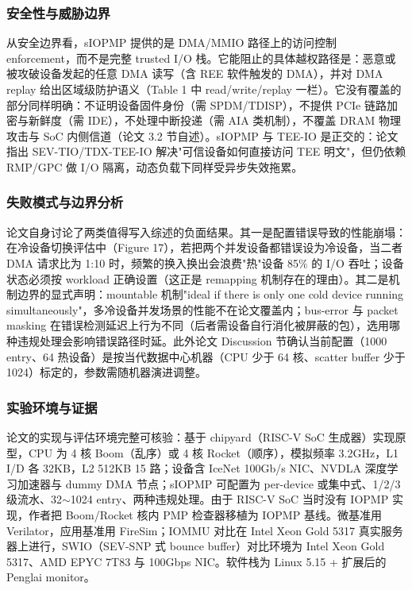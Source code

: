 \documentclass[11pt]{ctexart}
\begin{document}
\subsubsection{安全性与威胁边界}
从安全边界看，sIOPMP 提供的是 DMA/MMIO 路径上的访问控制 enforcement，而不是完整 trusted I/O 栈。它能阻止的具体越权路径是：恶意或被攻破设备发起的任意 DMA 读写（含 REE 软件触发的 DMA），并对 DMA replay 给出区域级防护语义（Table 1 中 read/write/replay 一栏）。它没有覆盖的部分同样明确：不证明设备固件身份（需 SPDM/TDISP），不提供 PCIe 链路加密与新鲜度（需 IDE），不处理中断投递（需 AIA 类机制），不覆盖 DRAM 物理攻击与 SoC 内侧信道（论文 3.2 节自述）。sIOPMP 与 TEE-IO 是正交的：论文指出 SEV-TIO/TDX-TEE-IO 解决"可信设备如何直接访问 TEE 明文"，但仍依赖 RMP/GPC 做 I/O 隔离，动态负载下同样受异步失效拖累。\par
\subsubsection{失败模式与边界分析}
论文自身讨论了两类值得写入综述的负面结果。其一是配置错误导致的性能崩塌：在冷设备切换评估中（Figure 17），若把两个并发设备都错误设为冷设备，当二者 DMA 请求比为 1:10 时，频繁的换入换出会浪费"热"设备 85\% 的 I/O 吞吐；设备状态必须按 workload 正确设置（这正是 remapping 机制存在的理由）。其二是机制边界的显式声明：mountable 机制"ideal if there is only one cold device running simultaneously"，多冷设备并发场景的性能不在论文覆盖内；bus-error 与 packet masking 在错误检测延迟上行为不同（后者需设备自行消化被屏蔽的包），选用哪种违规处理会影响错误路径时延。此外论文 Discussion 节确认当前配置（1000 entry、64 热设备）是按当代数据中心机器（CPU 少于 64 核、scatter buffer 少于 1024）标定的，参数需随机器演进调整。\par
\subsubsection{实验环境与证据}
论文的实现与评估环境完整可核验：基于 chipyard（RISC-V SoC 生成器）实现原型，CPU 为 4 核 Boom（乱序）或 4 核 Rocket（顺序），模拟频率 3.2GHz，L1 I/D 各 32KB，L2 512KB 15 路；设备含 IceNet 100Gb/s NIC、NVDLA 深度学习加速器与 dummy DMA 节点；sIOPMP 可配置为 per-device 或集中式、1/2/3 级流水、32$\sim$1024 entry、两种违规处理。由于 RISC-V SoC 当时没有 IOPMP 实现，作者把 Boom/Rocket 核内 PMP 检查器移植为 IOPMP 基线。微基准用 Verilator，应用基准用 FireSim；IOMMU 对比在 Intel Xeon Gold 5317 真实服务器上进行，SWIO（SEV-SNP 式 bounce buffer）对比环境为 Intel Xeon Gold 5317、AMD EPYC 7T83 与 100Gbps NIC。软件栈为 Linux 5.15 + 扩展后的 Penglai monitor。\par
\end{document}

